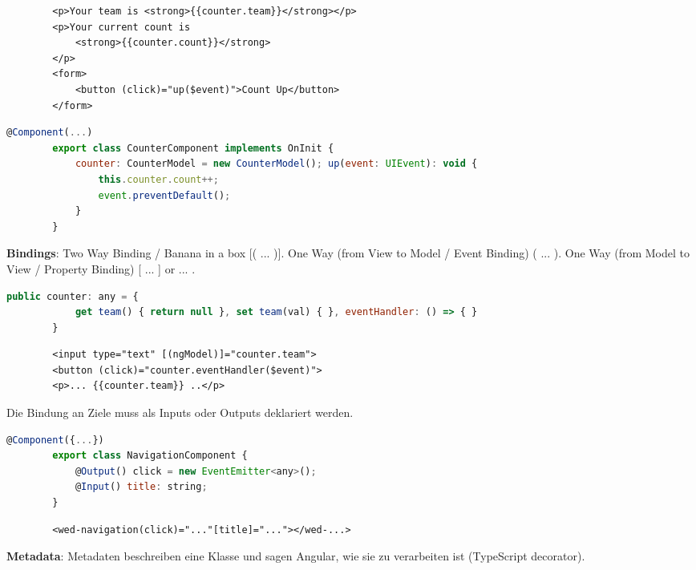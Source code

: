 \documentclass[10pt,landscape]{article}
\begin{document}
\begin{multicols}{2}
        \begin{lstlisting}
        <p>Your team is <strong>{{counter.team}}</strong></p>
        <p>Your current count is
            <strong>{{counter.count}}</strong>
        </p>
        <form>
            <button (click)="up($event)">Count Up</button>
        </form>
       \end{lstlisting}\begin{lstlisting}[language=JavaScript]
        @Component(...)
        export class CounterComponent implements OnInit {
            counter: CounterModel = new CounterModel(); up(event: UIEvent): void {
                this.counter.count++;
                event.preventDefault();
            }
        }
        \end{lstlisting}

        \textbf{Bindings}: Two Way Binding / Banana in a box [( ... )].
        One Way (from View to Model / Event Binding) ( ... ).
        One Way (from Model to View / Property Binding) [ ... ] or {{ ... }}.

        \begin{lstlisting}[language=JavaScript]
        public counter: any = {
            get team() { return null }, set team(val) { }, eventHandler: () => { }
        }
        \end{lstlisting}\begin{lstlisting}
        <input type="text" [(ngModel)]="counter.team">
        <button (click)="counter.eventHandler($event)">
        <p>... {{counter.team}} ..</p>
        \end{lstlisting}

        Die Bindung an Ziele muss als Inputs oder Outputs deklariert werden.

        \begin{lstlisting}[language=JavaScript]
        @Component({...})
        export class NavigationComponent {
            @Output() click = new EventEmitter<any>();
            @Input() title: string;
        }
        \end{lstlisting}\begin{lstlisting}
        <wed-navigation(click)="..."[title]="..."></wed-...>
        \end{lstlisting}

        \textbf{Metadata}: Metadaten beschreiben eine Klasse und sagen Angular, wie sie zu verarbeiten ist (TypeScript decorator).


\end{multicols}
\end{document}
